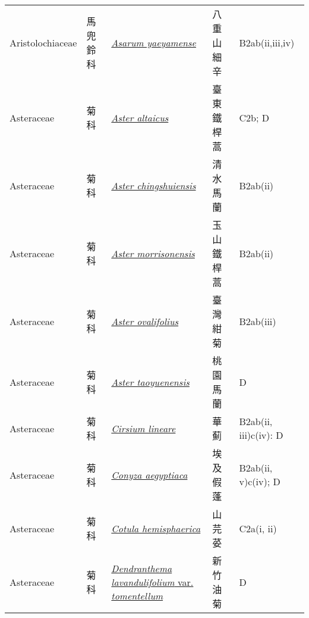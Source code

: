 {\begin{longtable}{p{2.5cm}p{2.5cm}p{4.5cm}p{2.5cm}p{3cm}}
    Aristolochiaceae & 馬兜鈴科 & \href{http://www.theplantlist.org/tpl1.1/search?q=Asarum+yaeyamense}{\textit{Asarum yaeyamense} } & 八重山細辛 & B2ab(ii,iii,iv) \index{Asarum@\textit{Asarum}!yaeyamense@\textit{yaeyamense}}  \index{八重山細辛} \\
    Asteraceae & 菊科 & \href{http://www.theplantlist.org/tpl1.1/search?q=Aster+altaicus}{\textit{Aster altaicus} } & 臺東鐵桿蒿 & C2b; D \index{Aster@\textit{Aster}!altaicus@\textit{altaicus}}  \index{臺東鐵桿蒿} \\
    Asteraceae & 菊科 & \href{http://www.theplantlist.org/tpl1.1/search?q=Aster+chingshuiensis}{\textit{Aster chingshuiensis} } & 清水馬蘭 & B2ab(ii) \index{Aster@\textit{Aster}!chingshuiensis@\textit{chingshuiensis}}  \index{清水馬蘭} \\
    Asteraceae & 菊科 & \href{http://www.theplantlist.org/tpl1.1/search?q=Aster+morrisonensis}{\textit{Aster morrisonensis} } & 玉山鐵桿蒿 & B2ab(ii) \index{Aster@\textit{Aster}!morrisonensis@\textit{morrisonensis}}  \index{玉山鐵桿蒿} \\
    Asteraceae & 菊科 & \href{http://www.theplantlist.org/tpl1.1/search?q=Aster+ovalifolius}{\textit{Aster ovalifolius} } & 臺灣紺菊 & B2ab(iii) \index{Aster@\textit{Aster}!ovalifolius@\textit{ovalifolius}}  \index{臺灣紺菊} \\
    Asteraceae & 菊科 & \href{http://www.theplantlist.org/tpl1.1/search?q=Aster+taoyuenensis}{\textit{Aster taoyuenensis} } & 桃園馬蘭 & D \index{Aster@\textit{Aster}!taoyuenensis@\textit{taoyuenensis}}  \index{桃園馬蘭} \\
    Asteraceae & 菊科 & \href{http://www.theplantlist.org/tpl1.1/search?q=Cirsium+lineare}{\textit{Cirsium lineare} } & 華薊 & B2ab(ii, iii)c(iv): D \index{Cirsium@\textit{Cirsium}!lineare@\textit{lineare}}  \index{華薊} \\
    Asteraceae & 菊科 & \href{http://www.theplantlist.org/tpl1.1/search?q=Conyza+aegyptiaca}{\textit{Conyza aegyptiaca} } & 埃及假蓬 & B2ab(ii, v)c(iv); D \index{Conyza@\textit{Conyza}!aegyptiaca@\textit{aegyptiaca}}  \index{埃及假蓬} \\
    Asteraceae & 菊科 & \href{http://www.theplantlist.org/tpl1.1/search?q=Cotula+hemisphaerica}{\textit{Cotula hemisphaerica} } & 山芫荽 & C2a(i, ii) \index{Cotula@\textit{Cotula}!hemisphaerica@\textit{hemisphaerica}}  \index{山芫荽} \\
    Asteraceae & 菊科 & \href{http://www.theplantlist.org/tpl1.1/search?q=Dendranthema+lavandulifolium+var.+tomentellum}{\textit{Dendranthema lavandulifolium} var. \textit{tomentellum} } & 新竹油菊 & D \index{Dendranthema@\textit{Dendranthema}!lavandulifolium@\textit{lavandulifolium}!var. tomentellum@var. \textit{tomentellum}}  \index{新竹油菊} \\

\end{longtable}}
